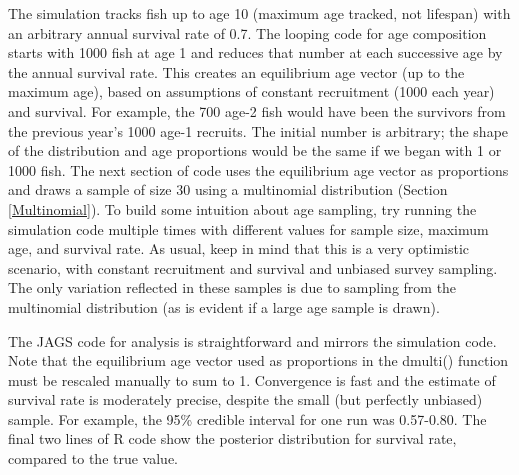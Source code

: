 \documentclass[
]{krantz}
\begin{document}
The simulation tracks fish up to age 10 (maximum age tracked, not lifespan) with an arbitrary annual survival rate of 0.7. The looping code for age composition starts with 1000 fish at age 1 and reduces that number at each successive age by the annual survival rate. This creates an equilibrium age vector (up to the maximum age), based on assumptions of constant recruitment (1000 each year) and survival. For example, the 700 age-2 fish would have been the survivors from the previous year's 1000 age-1 recruits. The initial number is arbitrary; the shape of the distribution and age proportions would be the same if we began with 1 or 1000 fish. The next section of code uses the equilibrium age vector as proportions and draws a sample of size 30 using a multinomial distribution (Section \ref{Multinomial}). To build some intuition about age sampling, try running the simulation code multiple times with different values for sample size, maximum age, and survival rate. As usual, keep in mind that this is a very optimistic scenario, with constant recruitment and survival and unbiased survey sampling. The only variation reflected in these samples is due to sampling from the multinomial distribution (as is evident if a large age sample is drawn).

The JAGS code for analysis is straightforward and mirrors the simulation code. Note that the equilibrium age vector used as proportions in the dmulti() function must be rescaled manually to sum to 1. Convergence is fast and the estimate of survival rate is moderately precise, despite the small (but perfectly unbiased) sample. For example, the 95\% credible interval for one run was 0.57-0.80. The final two lines of R code show the posterior distribution for survival rate, compared to the true value.
\end{document}
